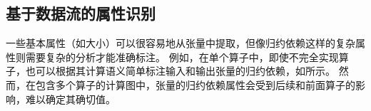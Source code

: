 


\subsection{基于数据流的属性识别}
一些基本属性（如大小）可以很容易地从张量中提取，但像归约依赖这样的复杂属性则需要复杂的分析才能准确标注。
例如，在单个算子中，即使不完全实现算子，也可以根据其计算语义简单标注输入和输出张量的归约依赖，如所示。
然而，在包含多个算子的计算图中，张量的归约依赖属性会受到后续和前面算子的影响，难以确定其确切值。

